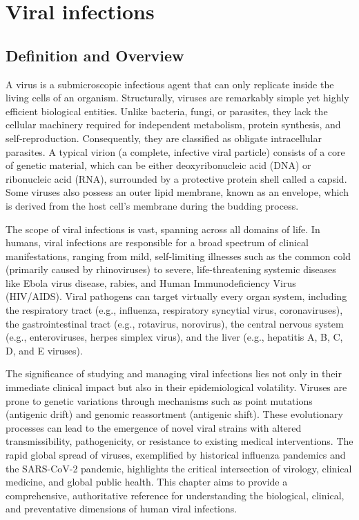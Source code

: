 \chapter{Viral infections}

\section*{Definition and Overview}
A virus is a submicroscopic infectious agent that can only replicate inside the living cells of an organism. Structurally, viruses are remarkably simple yet highly efficient biological entities. Unlike bacteria, fungi, or parasites, they lack the cellular machinery required for independent metabolism, protein synthesis, and self-reproduction. Consequently, they are classified as obligate intracellular parasites. A typical virion (a complete, infective viral particle) consists of a core of genetic material, which can be either deoxyribonucleic acid (DNA) or ribonucleic acid (RNA), surrounded by a protective protein shell called a capsid. Some viruses also possess an outer lipid membrane, known as an envelope, which is derived from the host cell's membrane during the budding process.

The scope of viral infections is vast, spanning across all domains of life. In humans, viral infections are responsible for a broad spectrum of clinical manifestations, ranging from mild, self-limiting illnesses such as the common cold (primarily caused by rhinoviruses) to severe, life-threatening systemic diseases like Ebola virus disease, rabies, and Human Immunodeficiency Virus (HIV/AIDS). Viral pathogens can target virtually every organ system, including the respiratory tract (e.g., influenza, respiratory syncytial virus, coronaviruses), the gastrointestinal tract (e.g., rotavirus, norovirus), the central nervous system (e.g., enteroviruses, herpes simplex virus), and the liver (e.g., hepatitis A, B, C, D, and E viruses).

The significance of studying and managing viral infections lies not only in their immediate clinical impact but also in their epidemiological volatility. Viruses are prone to genetic variations through mechanisms such as point mutations (antigenic drift) and genomic reassortment (antigenic shift). These evolutionary processes can lead to the emergence of novel viral strains with altered transmissibility, pathogenicity, or resistance to existing medical interventions. The rapid global spread of viruses, exemplified by historical influenza pandemics and the SARS-CoV-2 pandemic, highlights the critical intersection of virology, clinical medicine, and global public health. This chapter aims to provide a comprehensive, authoritative reference for understanding the biological, clinical, and preventative dimensions of human viral infections.

